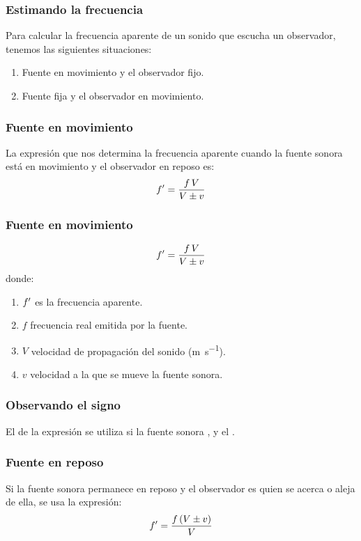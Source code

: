 \documentclass[14pt]{beamer}
\begin{document}
\begin{frame}
\frametitle{Estimando la frecuencia}
Para calcular la frecuencia aparente de un sonido que escucha un observador, tenemos las siguientes situaciones:
\pause
{}
\begin{enumerate}[<+->]
\item Fuente en movimiento y el observador fijo.
\item Fuente fija y el observador en movimiento.
\end{enumerate}
\end{frame}
\begin{frame}
\frametitle{Fuente en movimiento}
La expresión que nos determina la frecuencia aparente cuando la fuente sonora está en movimiento y el observador en reposo es:
\pause
\begin{align*}
{f}^{\prime} = \dfrac{f \, V}{V \pm v}
\end{align*}
\end{frame}
\begin{frame}
\frametitle{Fuente en movimiento}
\vspace*{-1cm}
\begin{align*}
{f}^{\prime} = \dfrac{f \, V}{V \pm v}
\end{align*}
donde:
\pause
{}
\begin{enumerate}[<+->]
\item ${f}^{\prime}$ es la frecuencia aparente.
\item $f$ frecuencia real emitida por la fuente.
\item $V$ velocidad de propagación del sonido (\unit{\meter\per\second}).
\item $v$ velocidad a la que se mueve la fuente sonora.
\end{enumerate}
\end{frame}
\begin{frame}
\frametitle{Observando el signo}
El  de la expresión se utiliza si la fuente sonora , \pause y el .
\end{frame}
\begin{frame}
\frametitle{Fuente en reposo}
Si la fuente sonora permanece en reposo y el observador es quien se acerca o aleja de ella, se usa la expresión:
\pause
\begin{align*}
{f}^{\prime} = \dfrac{f \, (V \pm v)}{V}
\end{align*}
\end{frame}
\end{document}
